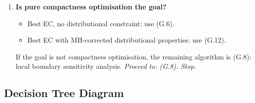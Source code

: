 \begin{enumerate}[label=\textbf{Q\arabic*.},start=3]
        \begin{itemize}
          \item Exact calibration (importance-weighted, user-specified):
                use \smcp{} for a percentile-selected plan, or \smc{} for
                an arbitrary plan from the particle cloud.
                Difference: \smcp{} returns the median plan (or $p$-th
                percentile); \smc{} returns the final particle.
                For court submissions, either is defensible; \smcp{} is
                preferred when the point estimate must be described precisely.
          \item Approximate calibration (MH-corrected chain): use \msp{}
                (G.10) as the default. \fr{} (G.9) is the alternative.
        \end{itemize}

        If distributional calibration is not required, proceed to Q6.

  \item \textbf{Is pure compactness optimisation the goal?}

        \begin{itemize}
          \item Best EC, no distributional constraint: use \sburst{} (G.6).
          \item Best EC with MH-corrected distributional properties: use
                \sburstf{} (G.12).
        \end{itemize}

        If the goal is not compactness optimisation, the remaining algorithm
        is \flip{} (G.8): local boundary sensitivity analysis.
        \emph{Proceed to: \flip{} (G.8). Stop.}

\end{enumerate}

\subsection{Decision Tree Diagram}

